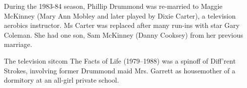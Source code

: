 During the 1983-84 season, Phillip Drummond was re-married to Maggie McKinney (Mary Ann Mobley and later played by Dixie Carter), a television aerobics instructor. Ms Carter was replaced after many run-ins with star Gary Coleman. She had one son, Sam McKinney (Danny Cooksey) from her previous marriage.

The television sitcom The Facts of Life (1979--1988) was a spinoff of Diff'rent Strokes, involving former Drummond maid Mrs. Garrett \cite{Ebery:1977a} as housemother of a dormitory at an all-girl private school.


